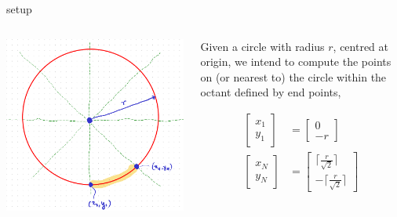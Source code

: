 \documentclass[aspectratio=169,xcolor={dvipsnames,svgnames}]{beamer}
\begin{document}
\begin{frame}[label={sec:orgdaef755}]{setup}
\begin{columns}
\begin{column}{.4\columnwidth}
\begin{center}
\includegraphics[width=.9\linewidth]{org-download-images/mid-point_algorithm/2024-09-03_21-50-20_screenshot.png}
\end{center}
\end{column}

\begin{column}{.6\columnwidth}
Given a circle with radius \(r\), centred at origin, we
intend to compute the points on (or nearest to) the
circle within the octant defined by end points,

\begin{align*}
  \begin{bmatrix} x_1 \\ y_1 \end{bmatrix}
  &= \begin{bmatrix} 0 \\ -r \end{bmatrix} \\
  \begin{bmatrix} x_N \\ y_N \end{bmatrix}
  &= \begin{bmatrix} \lceil\frac{r}{\sqrt{2}}\rceil \\
    -\lceil\frac{r}{\sqrt{2}}\rceil \end{bmatrix}
\end{align*}
\end{column}
\end{columns}
\end{frame}
\end{document}
